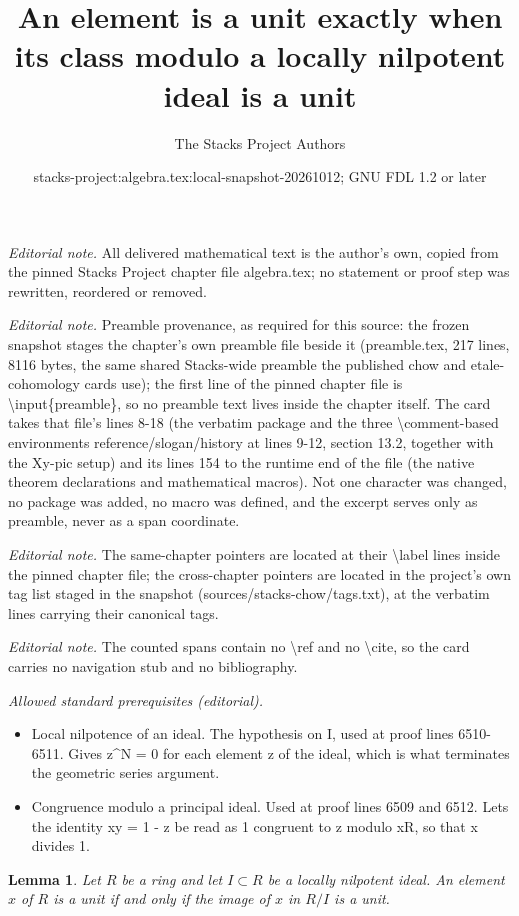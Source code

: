 \documentclass[10pt,a4paper]{amsart}
\title{An element is a unit exactly when its class modulo a locally nilpotent ideal is a unit}
\author{The Stacks Project Authors}
\date{stacks-project:algebra.tex:local-snapshot-20261012; GNU FDL 1.2 or later}
\theoremstyle{plain}
\newtheorem{lemma}[subsection]{Lemma}
\theoremstyle{definition}
\theoremstyle{remark}
\numberwithin{equation}{subsection}
\begin{document}
\maketitle
\noindent\textit{Editorial note.} All delivered mathematical text is the author's own, copied from the pinned Stacks Project chapter file algebra.tex; no statement or proof step was rewritten, reordered or removed.\par\medskip
\noindent\textit{Editorial note.} Preamble provenance, as required for this source: the frozen snapshot stages the chapter's own preamble file beside it (preamble.tex, 217 lines, 8116 bytes, the same shared Stacks-wide preamble the published chow and etale-cohomology cards use); the first line of the pinned chapter file is \textbackslash{}input\{preamble\}, so no preamble text lives inside the chapter itself. The card takes that file's lines 8-18 (the verbatim package and the three \textbackslash{}comment-based environments reference/slogan/history at lines 9-12, section 13.2, together with the Xy-pic setup) and its lines 154 to the runtime end of the file (the native theorem declarations and mathematical macros). Not one character was changed, no package was added, no macro was defined, and the excerpt serves only as preamble, never as a span coordinate.\par\medskip
\noindent\textit{Editorial note.} The same-chapter pointers are located at their \textbackslash{}label lines inside the pinned chapter file; the cross-chapter pointers are located in the project's own tag list staged in the snapshot (sources/stacks-chow/tags.txt), at the verbatim lines carrying their canonical tags.\par\medskip
\noindent\textit{Editorial note.} The counted spans contain no \textbackslash{}ref and no \textbackslash{}cite, so the card carries no navigation stub and no bibliography.\par\medskip
\noindent\textit{Allowed standard prerequisites (editorial).}\begin{itemize}
\item Local nilpotence of an ideal. The hypothesis on I, used at proof lines 6510-6511. Gives z\textasciicircum{}N = 0 for each element z of the ideal, which is what terminates the geometric series argument.
\item Congruence modulo a principal ideal. Used at proof lines 6509 and 6512. Lets the identity xy = 1 - z be read as 1 congruent to z modulo xR, so that x divides 1.
\end{itemize}\medskip
\begin{lemma}
\label{lemma-locally-nilpotent-unit}
Let $R$ be a ring and let $I \subset R$ be a locally nilpotent
ideal.
An element $x$ of $R$ is a unit if and only if the image of $x$
in $R/I$ is a unit.
\end{lemma}
\end{document}
